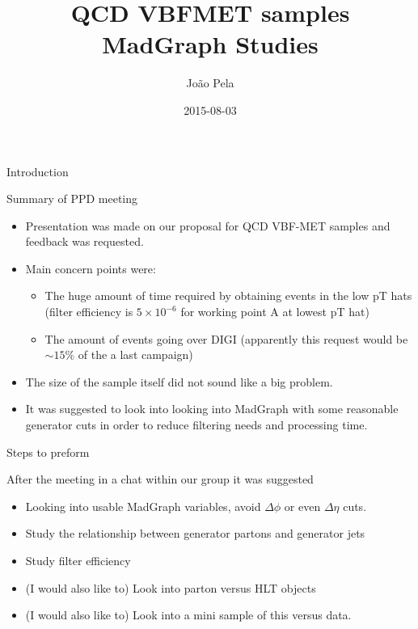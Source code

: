 \documentclass[8pt]{beamer}
\author[J. Pela]{João Pela}
\title{QCD VBFMET samples MadGraph Studies}
\institute[ICL]{Imperial College London}
\date{2015-08-03}
\begin{document}
\setlength{\unitlength}{1mm}

\begin{frame}
  \titlepage
\end{frame}

\begin{frame}{Introduction}

\begin{block}{Summary of PPD meeting}
  
\begin{itemize}
  \item Presentation was made on our proposal for QCD VBF-MET samples and feedback was requested.
  \item Main concern points were:
  \begin{itemize}
    \item The huge amount of time required by obtaining events in the low pT hats (filter efficiency is  $5 \times 10^{-6}$ for working point A at lowest pT hat) 
    \item The amount of events going over DIGI (apparently this request would be $\sim15\%$ of the a last campaign)
  \end{itemize}
  \item The size of the sample itself did not sound like a big problem.
  \item It was suggested to look into looking into MadGraph with some reasonable generator cuts in order to reduce filtering needs and processing time. 
\end{itemize}

\end{block}

\begin{block}{Steps to preform}

After the meeting in a chat within our group it was suggested 

\begin{itemize}
  \item Looking into usable MadGraph variables, avoid $\Delta\phi$ or even $\Delta\eta$ cuts.
  \item Study the relationship between generator partons and generator jets
  \item Study filter efficiency
  \item (I would also like to) Look into parton versus HLT objects
  \item (I would also like to) Look into a mini sample of this versus data. 
\end{itemize}

\end{block}

\end{frame}
\end{document}
